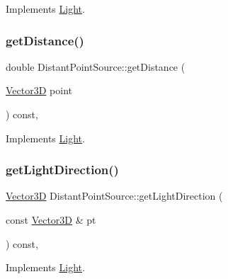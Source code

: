 Implements \mbox{\hyperlink{classLight_af5dc859ada149ca54ec5088e1c33deb4}{Light}}.

\mbox{\label{classDistantPointSource_a5d08b5655fc7fc09e5c0d2a0f3046e16}} 
\subsubsection{\texorpdfstring{getDistance()}{getDistance()}}
{\footnotesize\ttfamily double Distant\+Point\+Source\+::get\+Distance (\begin{DoxyParamCaption}\item[{\mbox{\hyperlink{classVector3D}{Vector3D}}}]{point }\end{DoxyParamCaption}) const\hspace{0.3cm}{\ttfamily [override]}, {\ttfamily [virtual]}}



Implements \mbox{\hyperlink{classLight_a4a7a5a9d4fc67da122c3ce75f6075093}{Light}}.

\mbox{\label{classDistantPointSource_a740ee32c41e2ef6deec1137c86f5b73a}} 
\subsubsection{\texorpdfstring{getLightDirection()}{getLightDirection()}}
{\footnotesize\ttfamily \mbox{\hyperlink{classVector3D}{Vector3D}} Distant\+Point\+Source\+::get\+Light\+Direction (\begin{DoxyParamCaption}\item[{const \mbox{\hyperlink{classVector3D}{Vector3D}} \&}]{pt }\end{DoxyParamCaption}) const\hspace{0.3cm}{\ttfamily [override]}, {\ttfamily [virtual]}}



Implements \mbox{\hyperlink{classLight_ac075908cf22e9ca9f289c1226d133664}{Light}}.

\mbox{\label{classDistantPointSource_a14f9c55d090d7d3f7999db70f5174a8c}} 
